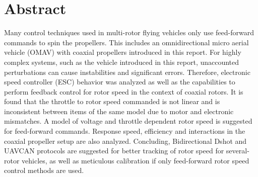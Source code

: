\chapter*{Abstract}

Many control techniques used in multi-rotor flying vehicles only use feed-forward commands to spin the propellers. This includes an omnidirectional micro aerial vehicle (OMAV) with coaxial propellers introduced in this report. For highly complex systems, such as the vehicle introduced in this report, unaccounted perturbations can cause instabilities and significant errors. Therefore, electronic speed controller (ESC) behavior was analyzed as well as the capabilities to perform feedback control for rotor speed in the context of coaxial rotors. It is found that the throttle to rotor speed commanded is not linear and is inconsistent between items of the same model due to motor and electronic mismatches. A model of voltage and throttle dependent rotor speed is suggested for feed-forward commands. Response speed, efficiency and interactions in the coaxial propeller setup are also analyzed. Concluding, Bidirectional Dshot and UAVCAN protocols are suggested for better tracking of rotor speed for several-rotor vehicles, as well as meticulous calibration if only feed-forward rotor speed control methods are used.